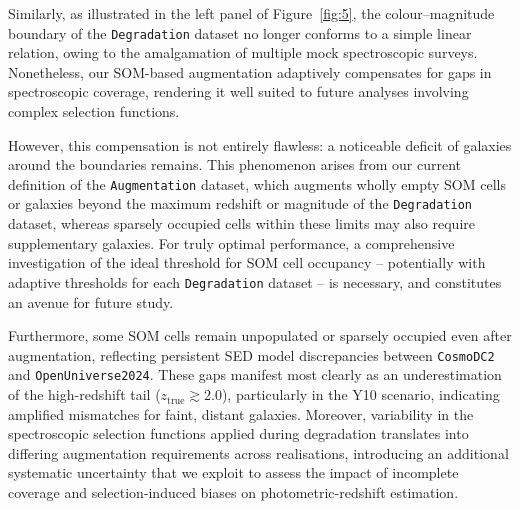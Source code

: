 Similarly, as illustrated in the left panel of Figure~\ref{fig:5}, the colour–magnitude boundary of the \texttt{Degradation} dataset no longer conforms to a simple linear relation, owing to the amalgamation of multiple mock spectroscopic surveys. Nonetheless, our SOM-based augmentation adaptively compensates for gaps in spectroscopic coverage, rendering it well suited to future analyses involving complex selection functions.

However, this compensation is not entirely flawless: a noticeable deficit of galaxies around the boundaries remains. This phenomenon arises from our current definition of the \texttt{Augmentation} dataset, which augments wholly empty SOM cells or galaxies beyond the maximum redshift or magnitude of the \texttt{Degradation} dataset, whereas sparsely occupied cells within these limits may also require supplementary galaxies. For truly optimal performance, a comprehensive investigation of the ideal threshold for SOM cell occupancy -- potentially with adaptive thresholds for each \texttt{Degradation} dataset -- is necessary, and constitutes an avenue for future study.

Furthermore, some SOM cells remain unpopulated or sparsely occupied even after augmentation, reflecting persistent SED model discrepancies between \texttt{CosmoDC2} and \texttt{OpenUniverse2024}. These gaps manifest most clearly as an underestimation of the high-redshift tail (\(z_\mathrm{true} \gtrsim 2.0\)), particularly in the Y10 scenario, indicating amplified mismatches for faint, distant galaxies. Moreover, variability in the spectroscopic selection functions applied during degradation translates into differing augmentation requirements across realisations, introducing an additional systematic uncertainty that we exploit to assess the impact of incomplete coverage and selection‐induced biases on photometric-redshift estimation.
